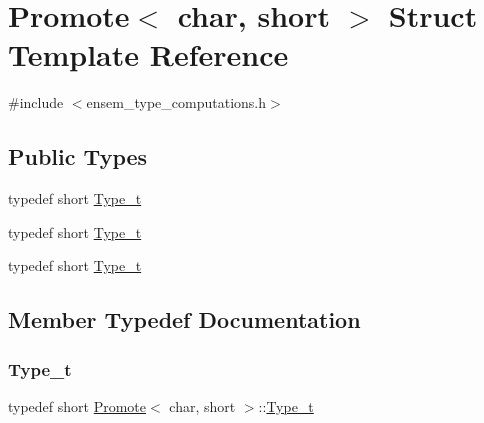 \hypertarget{structPromote_3_01char_00_01short_01_4}{}\section{Promote$<$ char, short $>$ Struct Template Reference}
\label{structPromote_3_01char_00_01short_01_4}


{\ttfamily \#include $<$ensem\+\_\+type\+\_\+computations.\+h$>$}

\subsection*{Public Types}
\begin{DoxyCompactItemize}
\item 
typedef short \mbox{\hyperlink{structPromote_3_01char_00_01short_01_4_a91c7f7533624b9bf6b3e703dee62287a}{Type\+\_\+t}}
\item 
typedef short \mbox{\hyperlink{structPromote_3_01char_00_01short_01_4_a91c7f7533624b9bf6b3e703dee62287a}{Type\+\_\+t}}
\item 
typedef short \mbox{\hyperlink{structPromote_3_01char_00_01short_01_4_a91c7f7533624b9bf6b3e703dee62287a}{Type\+\_\+t}}
\end{DoxyCompactItemize}


\subsection{Member Typedef Documentation}
\mbox{\label{structPromote_3_01char_00_01short_01_4_a91c7f7533624b9bf6b3e703dee62287a}} 
\subsubsection{\texorpdfstring{Type\_t}{Type\_t}\hspace{0.1cm}{\footnotesize\ttfamily [1/3]}}
{\footnotesize\ttfamily typedef short \mbox{\hyperlink{structPromote}{Promote}}$<$ char, short $>$\+::\mbox{\hyperlink{structPromote_3_01char_00_01short_01_4_a91c7f7533624b9bf6b3e703dee62287a}{Type\+\_\+t}}}

\mbox{\label{structPromote_3_01char_00_01short_01_4_a91c7f7533624b9bf6b3e703dee62287a}} 
